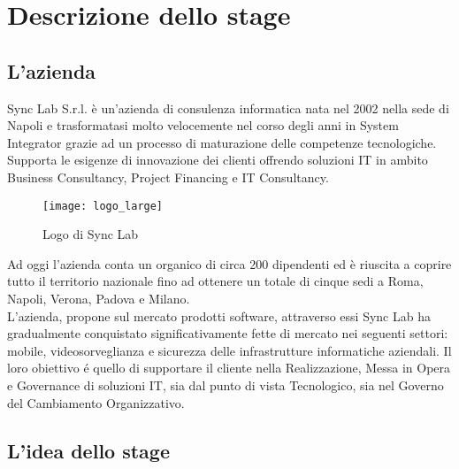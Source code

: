 
\chapter{Descrizione dello stage}
\label{cap:processi-metodologie}



\section{L'azienda}

Sync Lab S.r.l. è un'azienda di consulenza informatica nata nel 2002 nella sede di Napoli e trasformatasi molto velocemente nel corso degli anni in System Integrator grazie ad un processo di maturazione delle competenze tecnologiche. Supporta le esigenze di innovazione dei clienti offrendo soluzioni IT in ambito Business Consultancy, Project Financing e IT Consultancy.
\begin{figure}[h]
	\begin{center}
		\texttt{[image: logo\_large]}
		\caption{Logo di Sync Lab}
	\end{center}
\end{figure}
Ad oggi l'azienda conta un organico di circa 200 dipendenti ed è riuscita a coprire tutto il territorio nazionale fino ad ottenere un totale di cinque sedi a Roma, Napoli, Verona, Padova e Milano.\\
L'azienda, propone sul mercato prodotti software, attraverso essi Sync Lab ha gradualmente conquistato significativamente fette di mercato nei seguenti settori: mobile, videosorveglianza e sicurezza delle infrastrutture informatiche aziendali.
Il loro obiettivo é quello di supportare il cliente nella Realizzazione, Messa in Opera e Governance di soluzioni IT, sia dal punto di vista Tecnologico, sia nel Governo del Cambiamento Organizzativo.

\section{L'idea dello stage}

